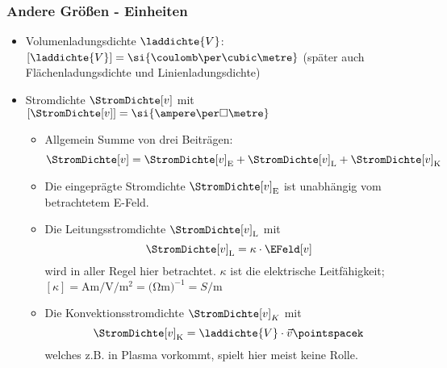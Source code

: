   \begin{frame}
    \frametitle{Andere Größen - Einheiten}
    \begin{itemize}[<+->]
      \item Volumenladungsdichte $\laddichte{V}$:
        $\left[\laddichte{V}\right] = \si{\coulomb\per\cubic\metre} $
        (später auch Flächenladungsdichte und Linienladungsdichte)
        \item Stromdichte	\(\StromDichte[v]\) mit
          \(\left[\StromDichte[v]\right] =
          \si{\ampere\per\square\metre} \)
          \begin{itemize}[<+->]
		\item Allgemein Summe von drei Beiträgen:
		\begin{equation*}
			\StromDichte[v] = \StromDichte[v]_\mathrm{E} + \StromDichte[v]_\mathrm{L} + \StromDichte[v]_\mathrm{K}
		\end{equation*}
                \item Die eingeprägte Stromdichte
                  \(\StromDichte[v]_\mathrm{E}\) ist unabhängig vom
                  betrachtetem E-Feld.
                \item Die Leitungsstromdichte \(\StromDichte[v]_\mathrm{L}\) mit
		\begin{equation*}
			\StromDichte[v]_\mathrm{L} = \kappa \cdot \EFeld[v]
		\end{equation*}
		wird in aller Regel hier betrachtet. $\kappa$ ist die
                elektrische Leitfähigkeit; $\left[\kappa\right] =\si{\ampere\metre\per\volt\per\square\metre}=\si{(\ohm\metre)^{-1}}=\si{S\per\metre}$
                \item Die Konvektionsstromdichte \(\StromDichte[v]_K\) mit
		\begin{equation*}
			\StromDichte[v]_\mathrm{K} = \laddichte{V} \cdot \vec{v} \pointspacek
		\end{equation*}
		welches z.B. in Plasma vorkommt, spielt hier meist
                keine Rolle. 
\end{itemize}
              \end{itemize}
    \end{frame}
